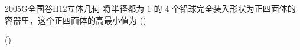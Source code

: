 
\begin{problem}{2005}{G}{全国卷II}{12}{立体几何}
将半径都为 $ 1 $ 的 $ 4 $ 个铅球完全装入形状为正四面体的容器里，这个正四面体的高最小值为 (\hspace{1cm})

(\hspace{1cm})
\begin{choices}
\end{choices}
\end{problem}

\begin{answer}

\end{answer}

\begin{solutions}

\end{solutions}